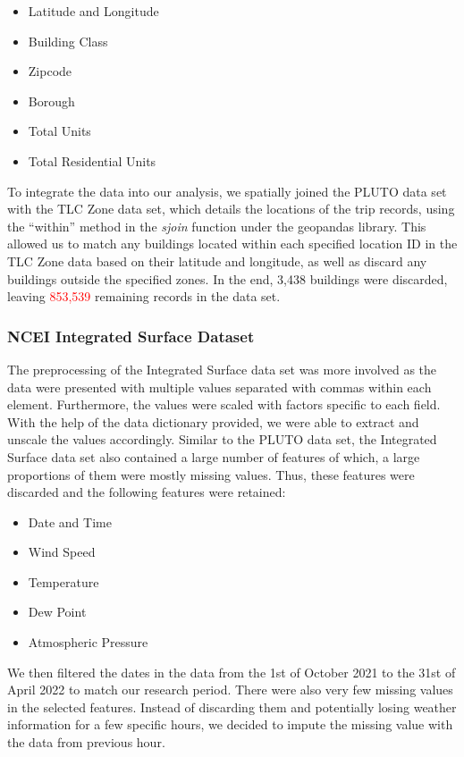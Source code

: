 \documentclass[11pt]{article}
\begin{document}
\begin{multicols}{3}
\begin{itemize}
  \item Latitude and Longitude
  \item Building Class
  \item Zipcode
  \item Borough
  \item Total Units
  \item Total Residential Units
\end{itemize}
\end{multicols}
To integrate the data into our analysis, we spatially joined the PLUTO data set with the TLC Zone data set, which details the locations of the trip records, using the ``within'' method in the \textit{sjoin} function under the geopandas library. This allowed us to match any buildings located within each specified location ID in the TLC Zone data based on their latitude and longitude, as well as discard any buildings outside the specified zones. In the end, 3,438 buildings were discarded, leaving \textcolor{red}{853,539} remaining records in the data set.

\subsubsection{NCEI Integrated Surface Dataset}
The preprocessing of the Integrated Surface data set was more involved as the data were presented with multiple values separated with commas within each element. Furthermore, the values were scaled with factors specific to each field. With the help of the data dictionary provided, we were able to extract and unscale the values accordingly. Similar to the PLUTO data set, the Integrated Surface data set also contained a large number of features of which, a large proportions of them were mostly missing values. Thus, these features were discarded and the following features were retained:
\begin{multicols}{3}
\begin{itemize}
  \item Date and Time
  \item Wind Speed
  \item Temperature
  \item Dew Point
  \item Atmospheric Pressure
\end{itemize}
\end{multicols}
We then filtered the dates in the data from the 1st of October 2021 to the 31st of April 2022 to match our research period. There were also very few missing values in the selected features. Instead of discarding them and potentially losing weather information for a few specific hours, we decided to impute the missing value with the data from previous hour. 
\end{document}
